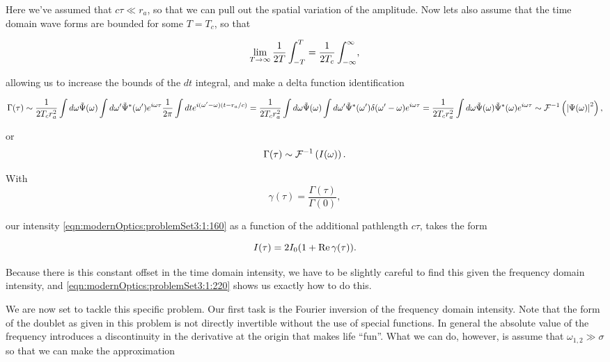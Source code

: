 {Here we've assumed that $c \tau \ll r_a$, so that we can pull out the spatial variation of the amplitude.  Now lets also assume that the time domain wave forms are bounded for some $T = T_c$, so that

\begin{dmath}\label{eqn:modernOptics:problemSet3:1:140}
\lim_{T \rightarrow \infty} \inv{2T} \int_{-T}^T = \inv{2 T_c} \int_{-\infty}^\infty,
\end{dmath}

allowing us to increase the bounds of the $dt$ integral, and make a delta function identification

\begin{dmath}\label{eqn:modernOptics:problemSet3:1:120b}
\Gamma(\tau) \sim
\inv{2 T_c r_a^2}
\int d\omega \tilde{\Psi}(\omega)
\int d\omega' \tilde{\Psi}^\conj(\omega')
e^{i \omega \tau}
\inv{2\pi}
\int
dt
e^{i (\omega' - \omega)( t - r_a/c )}
=
\inv{2 T_c r_a^2}
\int d\omega \tilde{\Psi}(\omega)
\int d\omega' \tilde{\Psi}^\conj(\omega') \delta(\omega' - \omega)
e^{i \omega \tau}
=
\inv{2 T_c r_a^2}
\int d\omega \tilde{\Psi}(\omega)
\tilde{\Psi}^\conj(\omega)
e^{i \omega \tau}
\sim \FF^{-1} \left( \Abs{\Psi(\omega)}^2 \right),
\end{dmath}

or
\begin{dmath}\label{eqn:modernOptics:problemSet3:1:180}
\Gamma(\tau) \sim \FF^{-1} \left( I(\omega) \right).
\end{dmath}

With
\begin{dmath}\label{eqn:modernOptics:problemSet3:1:200}
\gamma(\tau) = \frac{\Gamma(\tau)}{\Gamma(0)},
\end{dmath}

our intensity \ref{eqn:modernOptics:problemSet3:1:160} as a function of the additional pathlength $c \tau$, takes the form

\begin{dmath}\label{eqn:modernOptics:problemSet3:1:220}
I(\tau) = 2 I_0( 1 + \Real \gamma(\tau) ).
\end{dmath}

Because there is this constant offset in the time domain intensity, we have to be slightly careful to find this given the frequency domain intensity, and \ref{eqn:modernOptics:problemSet3:1:220} shows us exactly how to do this.


We are now set to tackle this specific problem.  Our first task is the Fourier inversion of the frequency domain intensity.  Note that the form of the doublet as given in this problem is not directly invertible without the use of special functions.  In general the absolute value of the frequency introduces a discontinuity in the derivative at the origin that makes life ``fun''.  What we can do, however, is assume that $\omega_{1,2} \gg \sigma$ so that we can make the approximation

}
